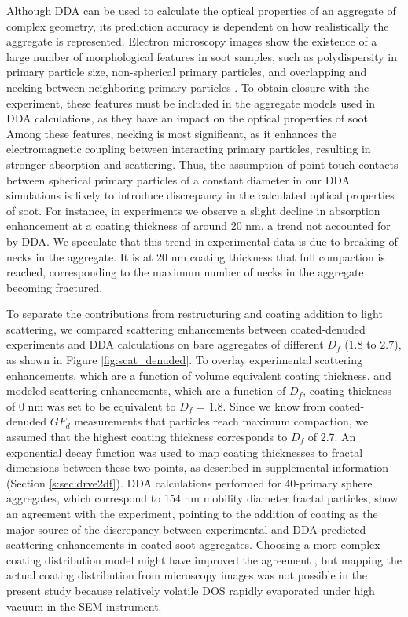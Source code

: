 Although DDA can be used to calculate the optical properties of an aggregate of complex geometry, its prediction accuracy is dependent on how realistically the aggregate is represented. Electron microscopy images show the existence of a large number of morphological features in soot samples, such as polydispersity in primary particle size, non-spherical primary particles, and overlapping and necking between neighboring primary particles \citep{RN24,RN28}. To obtain closure with the experiment, these features must be included in the aggregate models used in DDA calculations, as they have an impact on the optical properties of soot \citep{teng2019accounting}. Among these features, necking is most significant, as it enhances the electromagnetic coupling between interacting primary particles, resulting in stronger absorption and scattering. Thus, the assumption of point-touch contacts between spherical primary particles of a constant diameter in our DDA simulations is likely to introduce discrepancy in the calculated optical properties of soot. For instance, in experiments we observe a slight decline in absorption enhancement at a coating thickness of around 20 nm, a trend not accounted for by DDA. We speculate that this trend in experimental data is due to breaking of necks in the aggregate. It is at 20 nm coating thickness that full compaction is reached, corresponding to the maximum number of necks in the aggregate becoming fractured.

To separate the contributions from restructuring and coating addition to light scattering, we compared scattering enhancements between coated-denuded experiments and DDA calculations on bare aggregates of different $D_f$ ($1.8$ to $2.7$), as shown in Figure \ref{fig:scat_denuded}. To overlay experimental scattering enhancements, which are a function of volume equivalent coating thickness, and modeled scattering enhancements, which are a function of $D_f$, coating thickness of 0 nm was set to be equivalent to $D_f$ = 1.8. Since we know from coated-denuded $GF_{d}$ measurements that particles reach maximum compaction, we assumed that the highest coating thickness corresponds to $D_f$ of 2.7. An exponential decay function was used to map coating thicknesses to fractal dimensions between these two points, as described in supplemental information (Section \ref{s:sec:drve2df}). DDA calculations performed for 40-primary sphere aggregates, which correspond to 154 nm mobility diameter fractal particles, show an agreement with the experiment, pointing to the addition of coating as the major source of the discrepancy between experimental and DDA predicted scattering enhancements in coated soot aggregates. Choosing a more complex coating distribution model might have improved the agreement \citep{luo2019optical}, but mapping the actual coating distribution from microscopy images was not possible in the present study because relatively volatile DOS rapidly evaporated under high vacuum in the SEM instrument.


